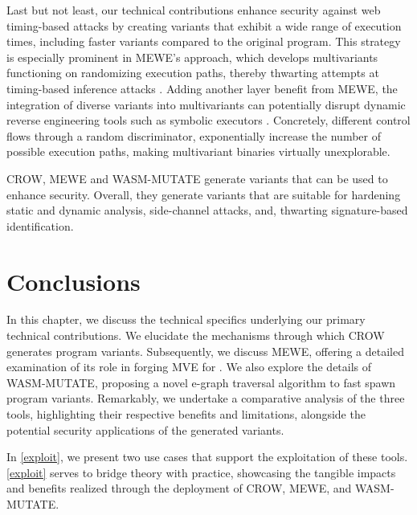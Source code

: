 Last but not least, our technical contributions enhance security against web timing-based attacks \cite{morgan2015web, DBLP:conf/ndss/SchnitzlerKBP23} by creating variants that exhibit a wide range of execution times, including faster variants compared to the original program. 
This strategy is especially prominent in MEWE’s approach, which develops multivariants functioning on randomizing execution paths, thereby thwarting attempts at timing-based inference attacks \cite{DBLP:conf/ndss/SchnitzlerKBP23}. 
Adding another layer benefit from MEWE, the integration of diverse variants into multivariants can potentially disrupt dynamic reverse engineering tools such as symbolic executors \cite{wasmixer}. 
Concretely, different control flows through a random discriminator, exponentially increase the number of possible execution paths, making multivariant binaries virtually unexplorable.


\begin{tcolorbox}[title=Takeaway,boxrule=1pt,arc=.2em,boxsep=1.0mm]
    CROW, MEWE and WASM-MUTATE generate \Wasm variants that can be used to enhance security. 
    Overall, they generate variants that are suitable for hardening static and dynamic analysis, side-channel attacks, and, thwarting signature-based identification. 
\end{tcolorbox}


\section{Conclusions}

In this chapter, we discuss the technical specifics underlying our primary technical contributions.
We elucidate the mechanisms through which CROW generates program variants.
Subsequently, we discuss MEWE, offering a detailed examination of its role in forging MVE for \Wasm. 
We also explore the details of WASM-MUTATE, proposing a novel e-graph traversal algorithm to fast spawn \wasm program variants. 
Remarkably, we undertake a comparative analysis of the three tools, highlighting their respective benefits and limitations, alongside the potential security applications of the generated \wasm variants. 

In \autoref{exploit}, we present two use cases that support the exploitation of these tools.
\autoref{exploit} serves to bridge theory with practice, showcasing the tangible impacts and benefits realized through the deployment of CROW, MEWE, and WASM-MUTATE.

